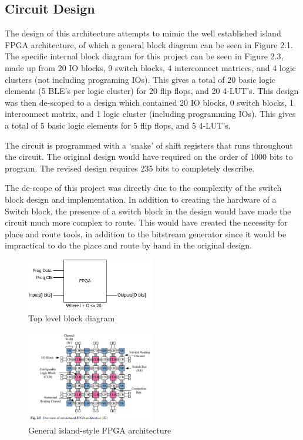 \documentclass[12pt]{article}
\begin{document}
\subsection{Circuit Design}

The design of this architecture attempts to mimic the well established island FPGA 
architecture, of which a general block diagram can be seen in Figure 2.1. The specific 
internal block diagram for this project can be seen in Figure 2.3, made up from 20 
IO blocks, 9 switch blocks, 4 interconnect matrices, and 4 logic clusters (not including 
programing IOs). This gives a total of 20 basic logic elements (5 BLE’s per logic 
cluster) for 20 flip flops, and 20 4-LUT’s. This design was then de-scoped to a design 
which contained 20 IO blocks, 0 switch blocks, 1 interconnect matrix, and 1 logic 
cluster (including programming IOs). This gives a total of 5 basic logic elements 
for 5 flip flops, and 5 4-LUT’s.


The circuit is programmed with a ‘snake’ of shift registers that runs throughout 
the circuit. The original design would have required on the order of 1000 bits to 
program. The revised design requires 235 bits to completely describe.


The de-scope of this project was directly due to the complexity of the switch block 
design and implementation. In addition to creating the hardware of a Switch block,
the presence of a switch block in the design would have made the circuit much more 
complex to route. This would have created the necessity for place and route tools,
in addition to the bitstream generator since it would be impractical to do the 
place and route by hand in the original design.

\begin{figure}[ht]
    \centering
    \includegraphics[width=0.5\textwidth]{toplevel}
    \caption{Top level block diagram}
    \label{fig:toplevel}
\end{figure}

\begin{figure}[ht]
    \centering
    \includegraphics[width=0.5\textwidth]{generalarch}
    \caption{General island-style FPGA architecture}
    \label{fig:generalarch}
\end{figure}
\end{document}
